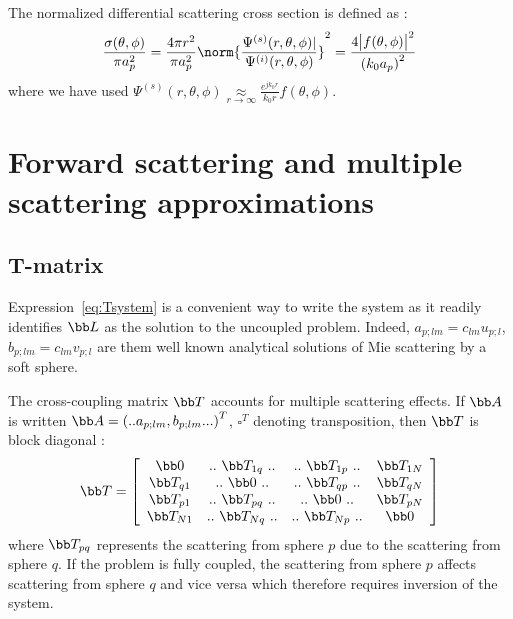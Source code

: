 The normalized differential scattering cross section is defined as :
%
\begin{equation}\label{eq:sigma}
  \frac{\sigma(\theta,\phi)}{\pi a_p^2}
  = \frac{4\pi r^2}{\pi a_p^2}
    \norm{\frac{\Psi^{(s)}(r,\theta,\phi)|}{\Psi^{(i)}(r,\theta,\phi)}}^2
  = \frac{4\bigl|f(\theta,\phi)\bigr|^2}{\left(k_0a_p\right)^2}
\end{equation}
%
where we have used
$\Psi^{(s)}(r,\theta,\phi) \underset{r\rightarrow\infty}\approx \frac{e^{jk_0r}}{k_0r}f(\theta,\phi)$.





\section{Forward scattering and multiple scattering approximations}
%
\subsection{T-matrix}
Expression~\eqref{eq:Tsystem} is a convenient way to write the system as it
readily identifies $\bb L$ as the solution to the uncoupled problem.
Indeed,
$a_{p;lm}=c_{lm}u_{p;l}$,
$b_{p;lm}=c_{lm}v_{p;l}$
are them well known analytical solutions of Mie scattering by a soft sphere.

The cross-coupling matrix $\bb T$ accounts for multiple scattering effects.
If $\bb A$ is written $\bb A=\left(..a_{p;lm},b_{p;lm}...\right)^T$,
$\square^T$ denoting transposition, then $\bb T$ is block diagonal :
%
\begin{equation*}
  \bb T =\left[
    \begin{array}{cccc}
      \bb 0      & ..~\bb T_{1q}~.. & ..~\bb T_{1p}~.. & \bb T_{1N}\\
      \bb T_{q1} & ..~\bb 0     ~.. & ..~\bb T_{qp}~.. & \bb T_{qN}\\
      \bb T_{p1} & ..~\bb T_{pq}~.. & ..~\bb 0     ~.. & \bb T_{pN}\\
      \bb T_{N1} & ..~\bb T_{Nq}~.. & ..~\bb T_{Np}~.. & \bb 0     \\
    \end{array}\right]
\end{equation*}
%
where $\bb T_{pq}$ represents the scattering from sphere $p$ due to the
scattering from sphere $q$. If the problem is fully coupled, the scattering
from sphere $p$ affects scattering from sphere $q$ and vice versa which
therefore requires inversion of the system.

